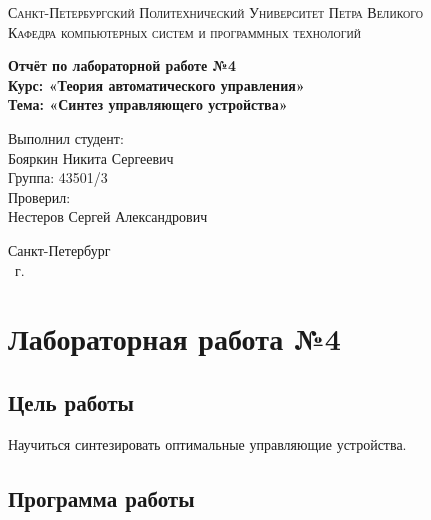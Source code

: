\documentclass[14pt,a4paper,report]{report}
\begin{document}
\def\contentsname{Содержание}

\begin{titlepage}
	\begin{center}
		\textsc{Санкт-Петербургский Политехнический 
			Университет Петра Великого\\[5mm]
			Кафедра компьютерных систем и программных технологий}
		
		\vfill
		
		\textbf{Отчёт по лабораторной работе №4\\[3mm]
			Курс: «Теория автоматического управления»\\[3mm]
			Тема: «Синтез управляющего устройства»\\[35mm]
			}
	\end{center}
	
	\hfill
	\begin{minipage}{.5\textwidth}
		Выполнил студент:\\[2mm] 
		Бояркин Никита Сергеевич\\
		Группа: 43501/3\\[5mm]
		
		Проверил:\\[2mm] 
		Нестеров Сергей Александрович
	\end{minipage}
	\vfill
	\begin{center}
		Санкт-Петербург\\ \the\year\ г.
	\end{center}
\end{titlepage}

\tableofcontents
\clearpage

\chapter{Лабораторная работа №4}

\section{Цель работы}

Научиться синтезировать оптимальные управляющие устройства.

\section{Программа работы}
\end{document}
